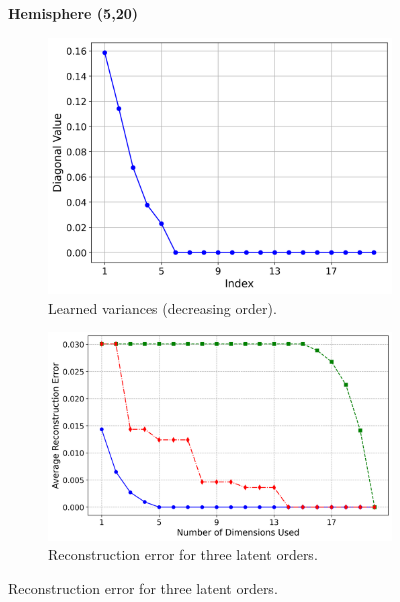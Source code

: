 \begin{figure}[htbp]
    \vspace{2em}
    \textbf{Hemisphere (5,20)} \par\vspace{0.4em}
    \begin{subfigure}[t]{0.43\textwidth}
        \centering
        \includegraphics[width=\linewidth]{Chapter5/results/visualisations/RAE/reconstruction/hemisphere_5_20/diagonal_values_normal_scale.png}
        \caption{Learned variances (decreasing order).}
        \label{fig:hemisphere_variances}
    \end{subfigure}
    \hfill
    \begin{subfigure}[t]{0.53\textwidth}
        \centering
        \includegraphics[width=\linewidth]{Chapter5/results/visualisations/RAE/reconstruction/hemisphere_5_20/reconstruction_error_plot_normal_scale.png}
        \caption{Reconstruction error for three latent orders.}
        \label{fig:hemisphere_reconstruction_errors}
    \end{subfigure}


\end{figure}
